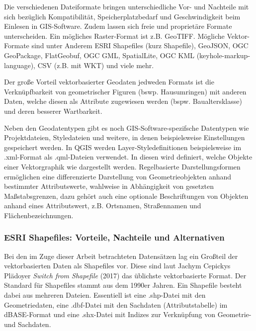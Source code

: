 			Die verschiedenen Dateiformate bringen unterschiedliche Vor- und Nachteile mit sich bezüglich Kompatibilität, Speicherplatzbedarf und Geschwindigkeit beim Einlesen in GIS-Software. Zudem lassen sich freie und proprietäre Formate unterscheiden. Ein mögliches Raster-Format ist z.B. GeoTIFF. Mögliche Vektor-Formate sind unter Anderem ESRI Shapefiles (kurz Shapefile), GeoJSON, OGC GeoPackage, FlatGeobuf, OGC GML, SpatialLite, OGC KML (keyhole-markup-language), CSV (z.B. mit WKT) und viele mehr.\cite{web_qgis_docs} 
			
			Der große Vorteil vektorbasierter Geodaten jedweden Formats ist die Verknüpfbarkeit von geometrischer Figuren (bswp. Hausumringen) mit anderen Daten, welche diesen als Attribute zugewiesen werden (bspw. Baualtersklasse) und deren besserer Wartbarkeit.  
			
			Neben den Geodatentypen gibt es noch GIS-Software-spezifsche Datentypen wie Projektdateien, Styledateien und weitere, in denen beispielsweise Einstellungen gespeichert werden. In QGIS werden Layer-Styledefinitionen beispielsweise im .xml-Format als .qml-Dateien verwendet. In diesen wird definiert, welche Objekte einer Vektorgraphik wie dargestellt werden. Regelbasierte Darstellungsformen ermöglichen eine differenzierte Darstellung von Geometrieobjekten anhand bestimmter Attributswerte, wahlweise in Abhängigkeit von gesetzten Maßstabsgrenzen, dazu gehört auch eine optionale Beschriftungen von Objekten anhand eines Attributswert, z.B. Ortsnamen, Straßennamen und Flächenbezeichnungen. 
			
			\subsubsection{ESRI Shapefiles: Vorteile, Nachteile und Alternativen}
				Bei den im Zuge dieser Arbeit betrachteten Datensätzen lag ein Großteil der vektorbasierten Daten als Shapefiles vor. Diese sind laut Jachym Cepickys Plädoyer \textit{Switch from Shapefile} (2017) das üblichste vektorbasierte Format. Der Standard für Shapefiles stammt aus dem 1990er Jahren. Ein Shapefile besteht dabei aus mehreren Dateien. Essentiell ist eine .shp-Datei mit den Geometriedaten, eine .dbf-Datei mit den Sachdaten (Attributstabelle) im dBASE-Format und eine .shx-Datei mit Indizes zur Verknüpfung von Geometrie- und Sachdaten. \cite{web_shapefiles_must_die_cepicky}\cite{esri_shapefile_technical_description}
				
